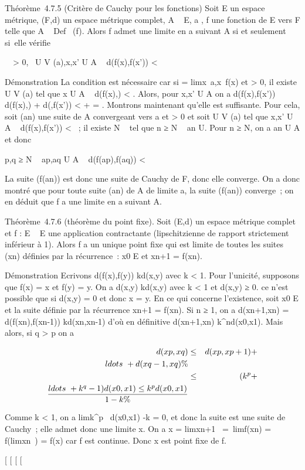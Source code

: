 Théorème~4.7.5 (Critère de Cauchy pour les fonctions) Soit E un espace
métrique, (F,d) un espace métrique complet, A \subset~ E, a
\in\overlineA, f une fonction de E vers F telle que A
\subset~ Def~ (f). Alors f admet une limite en a
suivant A si et seulement si~elle vérifie

\forall~~\epsilon \textgreater{} 0,
\exists~U \in V (a),\quad x,x' \in U \bigcap A \rigtharrow~
d(f(x),f(x')) \textless{} \epsilon

Démonstration La condition est nécessaire car si \ell
= limx\rightarrow~a,x\inA~f(x) et \epsilon \textgreater{}
0, il existe U \in V (a) tel que x \in U \bigcap A \rigtharrow~ d(f(x),\ell) \textless{} \epsilon{}.
Alors, pour x,x' \in U \bigcap A on a d(f(x),f(x')) \leq d(f(x),\ell) + d(\ell,f(x'))
\textless{} \epsilon{} + \epsilon{} = \epsilon. Montrons maintenant qu'elle est suffisante.
Pour cela, soit (an) une suite de A convergeant vers a et \epsilon
\textgreater{} 0 et soit U \in V (a) tel que x,x' \in U \bigcap A \rigtharrow~ d(f(x),f(x'))
\textless{} \epsilon~; il existe N \in {}~ tel que n ≥ N \rigtharrow~ an \in U. Pour n
≥ N, on a an \in U \bigcap A et donc

p,q ≥ N \rigtharrow~ ap,aq \in U \bigcap A \rigtharrow~
d(f(ap),f(aq)) \textless{} \epsilon

La suite (f(an)) est donc une suite de Cauchy de F, donc elle
converge. On a donc montré que pour toute suite (an) de A de
limite a, la suite (f(an)) converge~; on en déduit que f a une
limite en a suivant A.

Théorème~4.7.6 (théorème du point fixe). Soit (E,d) un espace métrique
complet et f : E \rightarrow~ E une application contractante (lipschitzienne de
rapport strictement inférieur à 1). Alors f a un unique point fixe qui
est limite de toutes les suites (xn) définies par la
récurrence~: x0 \in E et xn+1 = f(xn).

Démonstration Ecrivons d(f(x),f(y)) \leq kd(x,y) avec k \textless{} 1. Pour
l'unicité, supposons que f(x) = x et f(y) = y. On a d(x,y) \leq kd(x,y)
avec k \textless{} 1 et d(x,y) ≥ 0. ce n'est possible que si d(x,y) = 0
et donc x = y. En ce qui concerne l'existence, soit x0 \in E et
la suite définie par la récurrence xn+1 = f(xn). Si
n ≥ 1, on a d(xn+1,xn) =
d(f(xn),f(xn-1)) \leq kd(xn,xn-1)
d'où en définitive d(xn+1,xn) \leq
k^nd(x0,x1). Mais alors, si q
\textgreater{} p on a

\begin{align*} d(xp,xq)& \leq&
d(xp,xp+1) +
\\ldots~ +
d(xq-1,xq) \%& \\ &
\leq& (k^p +
\\ldots~ +
k^q-1)d(x 0,x1) \leq k^p
d(x0,x1) \over 1 - k \%&
\\ \end{align*}

Comme k \textless{} 1, on a
limk^p~
d(x0,x1) -k = 0, et donc la
suite est une suite de Cauchy~; elle admet donc une limite x. On a x
= limxn+1~ =\
limf(xn) = f(limxn~) =
f(x) car f est continue. Donc x est point fixe de f.

{[}
{[}
{[}
{[}
